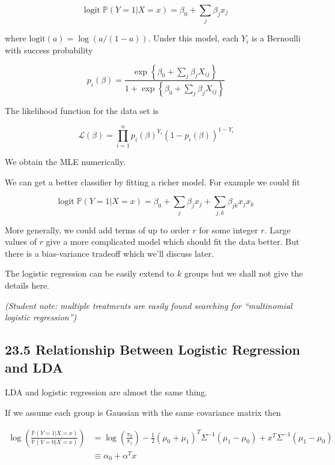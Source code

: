 \[ \text{logit} \; \mathbb{P}(Y = 1 | X = x) = \beta_{0} + \sum_{j} \beta_{j} x_{j} \]

where \(\text{logit}(a) = \log (a / (1 - a))\). Under this model, each
\(Y_{i}\) is a Bernoulli with success probability

\[ p_{i}(\beta) = \frac{\exp \left\{ \beta_{0} + \sum_{j} \beta_{j} X_{ij} \right\} }{1 + \exp \left\{ \beta_{0} + \sum_{j} \beta_{j} X_{ij} \right\} } \]

The likelihood function for the data set is

\[ \mathcal{L}(\beta) = \prod_{i=1}^{n} p_{i}(\beta)^{Y_{i}} (1 - p_{i}(\beta))^{1 - Y_{i}}\]

We obtain the MLE numerically.

We can get a better classifier by fitting a richer model. For example we
could fit

\[ \text{logit} \; \mathbb{P}(Y = 1 | X = x) = \beta_{0} + \sum_{j} \beta_{j} x_{j} + \sum_{j, k} \beta_{jk} x_{j} x_{k} \]

More generally, we could add terms of up to order \(r\) for some integer
\(r\). Large values of \(r\) give a more complicated model which should
fit the data better. But there is a bias-variance tradeoff which we'll
discuss later.

The logistic regression can be easily extend to \(k\) groups but we
shall not give the details here.

\emph{(Student note: multiple treatments are easily found searching for
``multinomial logistic regression'')}

\subsection*{23.5 Relationship Between Logistic Regression and LDA}\label{relationship-between-logistic-regression-and-lda}

LDA and logistic regression are almost the same thing.

If we assume each group is Gaussian with the same covariance matrix then

\begin{align*}
\log \left( \frac{\mathbb{P}(Y = 1 | X = x)}{\mathbb{P}(Y = 0 | X = x)} \right) 
&= \log \left( \frac{\pi_{0}}{\pi_{1}} \right) - \frac{1}{2} (\mu_{0} + \mu_{1})^T \Sigma^{-1} (\mu_{1} - \mu_{0}) + x^T \Sigma^{-1}( \mu_{1} - \mu_{0}) \\
&\equiv \alpha_{0} + \alpha^T x
\end{align*}

